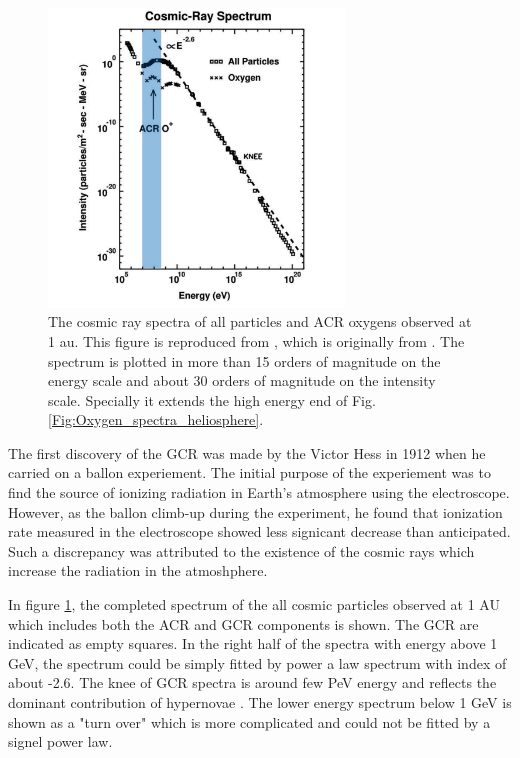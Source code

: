 \begin{figure}[htb]
	\centering
	\includegraphics[width = 0.7\textwidth]{images/gcr_spectra_shadow.png}
	\caption[The cosmic ray spectra of all particles at 1 au]{The cosmic ray spectra of all particles and ACR oxygens observed at 1 au. This figure is reproduced from \citet{Giacalone2022SSRv, Giacalone2012SSRv}, which is originally from \citet{Jokipii1990AIPC}.
	The spectrum is plotted in more than 15 orders of magnitude on the energy scale and about 30 orders of magnitude on the intensity scale. Specially it extends the high energy end of Fig.\ref{Fig:Oxygen_spectra_heliosphere}.}
	\label{Fig:Oxygen_spectra_cosmic_ray}
\end{figure}
The first discovery of the \ac{GCR} was made by the Victor Hess in 1912 when he carried on a ballon experiement. The initial purpose of the experiement was to find the source of ionizing radiation in Earth's atmosphere using the electroscope. However, as the ballon climb-up during the experiment, he found that ionization rate measured in the electroscope showed less signicant decrease than anticipated. Such a discrepancy was attributed to the existence of the cosmic rays which increase the radiation in the atmoshphere.

In figure \ref{Fig:Oxygen_spectra_cosmic_ray}, the completed spectrum of the all cosmic particles observed at 1 AU which includes both the \ac{ACR} and \ac{GCR} components is shown. The \acs{GCR} are indicated as empty squares. In the right half of the spectra with energy above 1 GeV, the spectrum could be simply fitted by power a law spectrum with index of about -2.6. The knee of GCR spectra is around few PeV energy and reflects the dominant contribution of hypernovae \citep{Sveshnikova2003AA, Hoerandel2003APh}. The lower energy spectrum  below 1 GeV is shown as a "turn over" which is more complicated and could not be fitted by a signel power law. 

